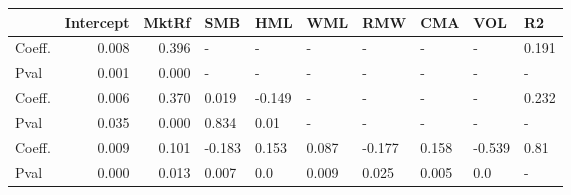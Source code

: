 \begin{tabular}{lrrlllllll}
\toprule
{} &  Intercept &  MktRf &    SMB &    HML &    WML &    RMW &    CMA &    VOL &     R2 \\
\midrule
Coeff.  &      0.008 &  0.396 &      - &      - &      - &      - &      - &      - &  0.191 \\
Pval    &      0.001 &  0.000 &      - &      - &      - &      - &      - &      - &      - \\
Coeff.  &      0.006 &  0.370 &  0.019 & -0.149 &      - &      - &      - &      - &  0.232 \\
Pval    &      0.035 &  0.000 &  0.834 &   0.01 &      - &      - &      - &      - &      - \\
Coeff.  &      0.009 &  0.101 & -0.183 &  0.153 &  0.087 & -0.177 &  0.158 & -0.539 &   0.81 \\
Pval    &      0.000 &  0.013 &  0.007 &    0.0 &  0.009 &  0.025 &  0.005 &    0.0 &      - \\
\bottomrule
\end{tabular}
